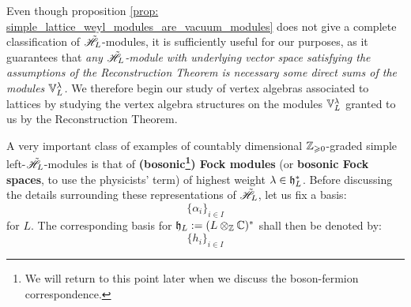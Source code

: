             Even though proposition \ref{prop: simple_lattice_weyl_modules_are_vacuum_modules} does not give a complete classification of $\tilde{\mathscr{H}}_L$-modules, it is sufficiently useful for our purposes, as it guarantees that \textit{any $\tilde{\mathscr{H}}_L$-module with underlying vector space satisfying the assumptions of the Reconstruction Theorem is necessary some direct sums of the modules $\mathbb{V}_L^{\lambda}$.} We therefore begin our study of vertex algebras associated to lattices by studying the vertex algebra structures on the modules $\mathbb{V}_L^{\lambda}$ granted to us by the Reconstruction Theorem. 
            \begin{example} \label{example: bosonic_fock_modules}
                A very important class of examples of countably dimensional $\mathbb{Z}_{\geqslant 0}$-graded simple left-$\tilde{\mathscr{H}}_L$-modules is that of \textbf{(bosonic\footnote{We will return to this point later when we discuss the boson-fermion correspondence.}) Fock modules} (or \textbf{bosonic Fock spaces}, to use the physicists' term) of highest weight $\lambda \in \mathfrak{h}_L^*$. Before discussing the details surrounding these representations of $\tilde{\mathscr{H}}_L$, let us fix a basis:
                    $$\{\alpha_i\}_{i \in I}$$
                for $L$. The corresponding basis for $\h_L := (L \tensor_{\Z} \bbC)^*$ shall then be denoted by:
                    $$\{h_i\}_{i \in I}$$
                

\end{example}
